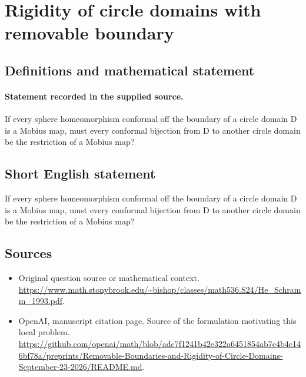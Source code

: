 \documentclass[11pt]{article}
\begin{document}
\section*{Rigidity of circle domains with removable boundary}\label{statement}
\subsection{Definitions and mathematical statement}
\paragraph{Statement recorded in the supplied source.}
If every sphere homeomorphism conformal off the boundary of a circle domain D is a Mobius map, must every conformal bijection from D to another circle domain be the restriction of a Mobius map?
\subsection{Short English statement}
If every sphere homeomorphism conformal off the boundary of a circle domain D is a Mobius map, must every conformal bijection from D to another circle domain be the restriction of a Mobius map?
\subsection{Sources}
\begin{itemize}
\item[S1] Original question source or mathematical context.
\url{https://www.math.stonybrook.edu/~bishop/classes/math536.S24/He_Schramm_1993.pdf}.
\item[S2] OpenAI, manuscript citation page. Source of the formulation motivating this local problem.
\url{https://github.com/openai/math/blob/adc7f1241b42e322a6451854ab7e4b4c146bf78a/preprints/Removable-Boundaries-and-Rigidity-of-Circle-Domains-September-23-2026/README.md}.
\end{itemize}
\end{document}
